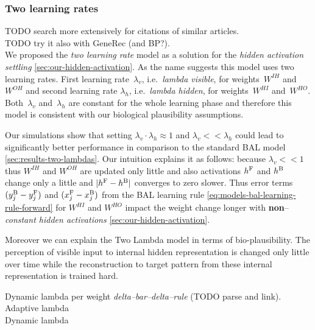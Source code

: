 
\subsubsection{Two learning rates} 
\label{sec:our-two-lambdas}

TODO search more extensively for citations of similar articles. \\
TODO try it also with GeneRec (and BP?).  \\ 

We proposed the \emph{two learning rate} model as a solution for the \emph{hidden activation settling} \ref{sec:our-hidden-activation}. As the name suggests this model uses two learning rates. First learning rate~$\lambda_v$, i.e.~\emph{lambda visible}, for weights~$W^{IH}$ and~$W^{OH}$ and second learning rate $\lambda_h$, i.e.~\emph{lambda hidden}, for weights~$W^{HI}$ and~$W^{HO}$. Both~$\lambda_v$ and~$\lambda_h$ are constant for the whole learning phase and therefore this model is consistent with our biological plausibility assumptions. 

Our simulations show that setting $\lambda_v \cdot \lambda_h \approx 1$ and $\lambda_v << \lambda_h$ could lead to significantly better performance in comparison to the standard BAL model \ref{sec:results-two-lambdas}. Our intuition explains it as follows: because $\lambda_v << 1$ thus $W^{IH}$ and $W^{OH}$ are updated only little and also activations $h^{\rm F}$ and $h^{\rm B}$ change only a little and $|h^{\rm F}- h^{\rm B}|$ converges to zero slower. Thus error terms $(y_j^{\rm B} - y_j^{\rm F})$ and $(x_j^{\rm F} - x_j^{\rm B})$ from the BAL learning rule \ref{eq:models-bal-learning-rule-forward} for $W^{HI}$ and $W^{HO}$ impact the weight change longer with {\bf non}--\emph{constant hidden activations} \ref{sec:our-hidden-activation}. 

Moreover we can explain the Two Lambda model in terms of bio-plausibility. The perception of visible input to internal hidden representation is changed only little over time while the reconstruction to target pattern from these internal representation is trained hard. 

Dynamic lambda per weight \emph{delta--bar--delta--rule} \citep{jacobs1988increased} (TODO parse and link). \\
Adaptive lambda \citep{riedmiller1993direct} \\
Dynamic lambda \citep{yu1997efficient} \\ 


